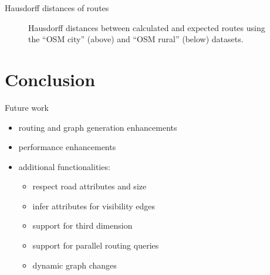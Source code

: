 \documentclass[xcolor={x11names}]{beamer}
\newenvironment{figcenter}
{%
	\parskip=0pt%
	\par%
	\nopagebreak%
	\centering%
}%
{%
	\par%
	\noindent%
	\ignorespacesafterend%
}
\begin{document}
		\begin{frame}{Hausdorff distances of routes}
			\begin{figure}
				\begin{figcenter}
					\scalebox{0.66}
					{
						
					}
					\scalebox{0.66}
					{
						
					}
				\end{figcenter}
				\caption{Hausdorff distances between calculated and expected routes using the \enquote{OSM city} (above) and \enquote{OSM rural} (below) datasets.}
			\end{figure}
		\end{frame}
	
	\section{Conclusion}
	
		\begin{frame}{Future work}
			\begin{itemize}
				\item routing and graph generation enhancements
				\item performance enhancements
				\item additional functionalities:
				\begin{itemize}
					\item respect road attributes and size
					\item infer attributes for visibility edges
					\item support for third dimension
					\item support for parallel routing queries
					\item dynamic graph changes
				\end{itemize}
			\end{itemize}
		\end{frame}
\end{document}
